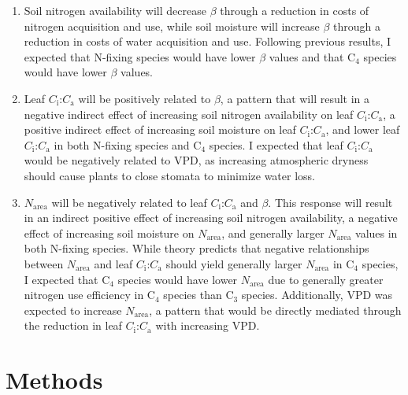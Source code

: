 \begin{enumerate}
    \item Soil nitrogen availability will decrease $\beta$ through a reduction in costs of nitrogen acquisition and use, while soil moisture will increase $\beta$ through a reduction in costs of water acquisition and use. Following previous results, I expected that N-fixing species would have lower $\beta$ values and that C$_4$ species would have lower $\beta$ values.
    
    \item Leaf $C_\mathrm{i}$:$C_\mathrm{a}$ will be positively related to $\beta$, a pattern that will result in a negative indirect effect of increasing soil nitrogen availability on leaf $C_\mathrm{i}$:$C_\mathrm{a}$, a positive indirect effect of increasing soil moisture on leaf $C_\mathrm{i}$:$C_\mathrm{a}$, and lower leaf $C_\mathrm{i}$:$C_\mathrm{a}$ in both N-fixing species and C$_4$ species. I expected that leaf $C_\mathrm{i}$:$C_\mathrm{a}$ would be negatively related to VPD, as increasing atmospheric dryness should cause plants to close stomata to minimize water loss.

    \item $N_\mathrm{area}$ will be negatively related to leaf $C_\mathrm{i}$:$C_\mathrm{a}$ and $\beta$. This response will result in an indirect positive effect of increasing soil nitrogen availability, a negative effect of increasing soil moisture on $N_\mathrm{area}$, and generally larger $N_\mathrm{area}$ values in both N-fixing species. While theory predicts that negative relationships between $N_\mathrm{area}$ and leaf $C_\mathrm{i}$:$C_\mathrm{a}$ should yield generally larger $N_\mathrm{area}$ in C$_4$ species, I expected that C$_4$ species would have lower $N_\mathrm{area}$ due to generally greater nitrogen use efficiency in C$_4$ species than C$_3$ species. Additionally, VPD was expected to increase $N_\mathrm{area}$, a pattern that would be directly mediated through the reduction in leaf $C_\mathrm{i}$:$C_\mathrm{a}$ with increasing VPD.
\end{enumerate}

\section{Methods}
